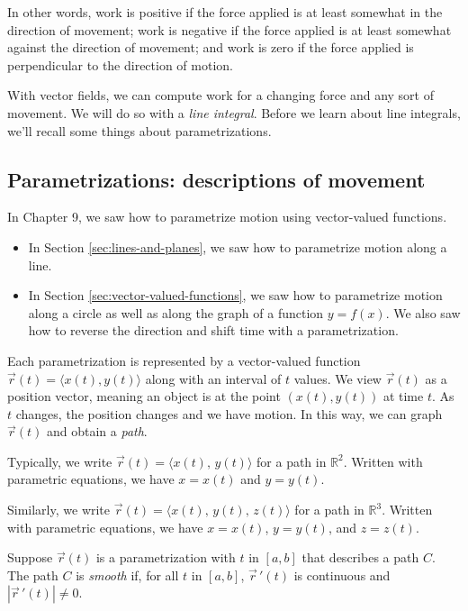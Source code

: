 \begin{framed}
    In other words, work is positive if the force applied is at least somewhat in the direction of movement; work is negative if the force applied is at least somewhat against the direction of movement; and work is zero if the force applied is perpendicular to the direction of motion.
\end{framed}

With vector fields, we can compute work for a changing force and any sort of movement. We will do so with a \emph{line integral}. Before we learn about line integrals, we'll recall some things about parametrizations.

\pagebreak 

\subsection{Parametrizations: descriptions of movement}
In Chapter 9, we saw how to parametrize motion using vector-valued functions.
\begin{itemize} 
    \item In Section \ref{sec:lines-and-planes}, we saw how to parametrize motion along a line. 
    \item In Section \ref{sec:vector-valued-functions}, we saw how to parametrize motion along a circle as well as along the graph of a function $y=f(x)$. We also saw how to reverse the direction and shift time with a parametrization.
\end{itemize}

Each parametrization is represented by a vector-valued function $\vec{r}(t)=\langle x(t),y(t)\rangle$ along with an interval of $t$ values. We view $\vec{r}(t)$ as a position vector, meaning an object is at the point $(x(t),y(t))$ at time $t$. As $t$ changes, the position changes and we have motion. In this way, we can graph $\vec{r}(t)$ and obtain a \emph{path}.

Typically, we write $\vec{r}(t)=\langle x(t),\, y(t)\rangle$ for a path in $\mathbb{R}^2$. Written with parametric equations, we have $x=x(t)$ and $y=y(t)$.

Similarly, we write $\vec{r}(t)=\langle x(t),\, y(t),\, z(t)\rangle$ for a path in $\mathbb{R}^3$. Written with parametric equations, we have $x=x(t)$, $y=y(t)$, and $z=z(t)$.

\begin{defn}
    Suppose $\vec{r}(t)$ is a parametrization with $t$ in $[a,b]$ that describes a path $C$. The path $C$ is \emph{smooth} if, for all $t$ in $[a,b]$, $\vec{r}\,'(t)$ is continuous and $|\vec{r}\,'(t)|\ne0$.
\end{defn} 

